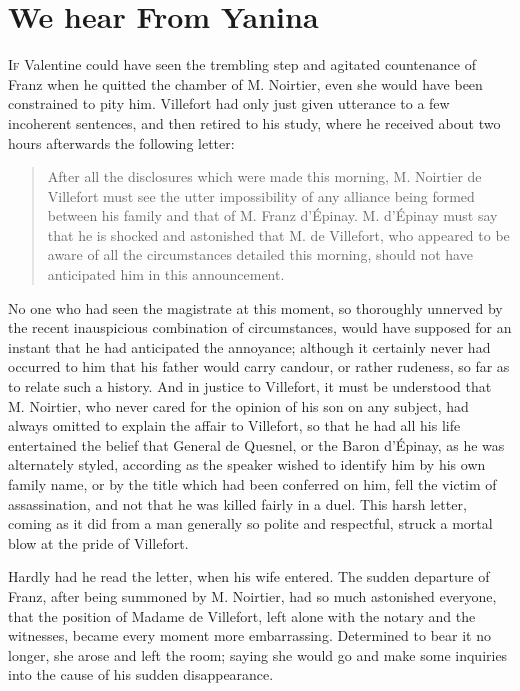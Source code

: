 \chapter{We hear From Yanina} 

 \lettrine{I}{f} Valentine could have seen the trembling step and agitated countenance of Franz when he quitted the chamber of M. Noirtier, even she would have been constrained to pity him. Villefort had only just given utterance to a few incoherent sentences, and then retired to his study, where he received about two hours afterwards the following letter: 
 
 \begin{quote}
After all the disclosures which were made this morning, M. Noirtier de Villefort must see the utter impossibility of any alliance being formed between his family and that of M. Franz d'Épinay. M. d'Épinay must say that he is shocked and astonished that M. de Villefort, who appeared to be aware of all the circumstances detailed this morning, should not have anticipated him in this announcement.
\end{quote}

 No one who had seen the magistrate at this moment, so thoroughly unnerved by the recent inauspicious combination of circumstances, would have supposed for an instant that he had anticipated the annoyance; although it certainly never had occurred to him that his father would carry candour, or rather rudeness, so far as to relate such a history. And in justice to Villefort, it must be understood that M. Noirtier, who never cared for the opinion of his son on any subject, had always omitted to explain the affair to Villefort, so that he had all his life entertained the belief that General de Quesnel, or the Baron d'Épinay, as he was alternately styled, according as the speaker wished to identify him by his own family name, or by the title which had been conferred on him, fell the victim of assassination, and not that he was killed fairly in a duel. This harsh letter, coming as it did from a man generally so polite and respectful, struck a mortal blow at the pride of Villefort. 

 Hardly had he read the letter, when his wife entered. The sudden departure of Franz, after being summoned by M. Noirtier, had so much astonished everyone, that the position of Madame de Villefort, left alone with the notary and the witnesses, became every moment more embarrassing. Determined to bear it no longer, she arose and left the room; saying she would go and make some inquiries into the cause of his sudden disappearance. 

